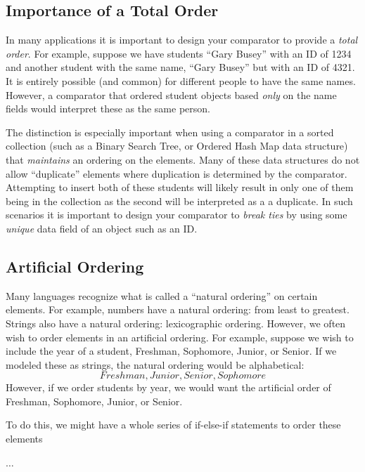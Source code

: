 \subsection{Importance of a Total Order}

In many applications it is important to design your comparator to
provide a \emph{total order}.  For example, suppose we have students
``Gary Busey'' with an ID of 1234 and another student with the same
name, ``Gary Busey'' but with an ID of 4321.  It is entirely possible
(and common) for different people to have the same names.  However,
a comparator that ordered student objects based \emph{only} on the
name fields would interpret these as the same person.  

The distinction is especially important when using a comparator in a
sorted collection (such as a Binary Search Tree, or Ordered Hash Map
data structure) that \emph{maintains} an ordering on the elements.
Many of these data structures do not allow ``duplicate'' elements where
duplication is determined by the comparator.  Attempting to insert both
of these students will likely result in only one of them being in
the collection as the second will be interpreted as a a duplicate.
In such scenarios it is important to design your comparator to 
\emph{break ties} by using some \emph{unique} data field of an object
such as an ID.

\subsection{Artificial Ordering}

Many languages recognize what is called a ``natural ordering'' on certain
elements.  For example, numbers have a natural ordering: from least to
greatest.  Strings also have a natural ordering: lexicographic ordering.
However, we often wish to order elements in an artificial ordering.
For example, suppose we wish to include the year of a student, Freshman,
Sophomore, Junior, or Senior.  If we modeled these as strings, the
natural ordering would be alphabetical:
  $$Freshman, Junior, Senior, Sophomore$$
However, if we order students by year, we would want the artificial
order of Freshman, Sophomore, Junior, or Senior.  

To do this, we might have a whole series of if-else-if statements to
order these elements
\begin{algorithm}[H]
$\ldots$
\end{algorithm}

